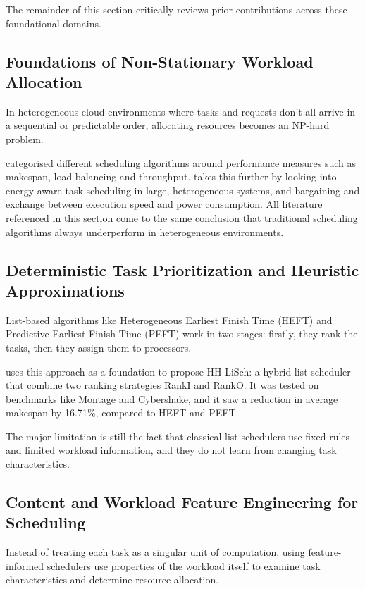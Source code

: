 The remainder of this section critically reviews prior contributions across these foundational domains.

\subsection{Foundations of Non-Stationary Workload Allocation}
In heterogeneous cloud environments where tasks and requests don't all arrive in a sequential or predictable order, allocating resources becomes an NP-hard problem.

\citet{Mathew2014Study} categorised different scheduling algorithms around performance measures such as makespan, load balancing and throughput. \citet{Saurav2021A} takes this further by looking into energy-aware task scheduling in large, heterogeneous systems, and bargaining and exchange between execution speed and power consumption. All literature referenced in this section come to the same conclusion that traditional scheduling algorithms always underperform in heterogeneous environments.

\subsection{Deterministic Task Prioritization and Heuristic Approximations}
List-based algorithms like Heterogeneous Earliest Finish Time (HEFT) and Predictive Earliest Finish Time (PEFT) work in two stages: firstly, they rank the tasks, then they assign them to processors.

\citet{HosseiniShirvani2021A} uses this approach as a foundation to propose HH-LiSch: a hybrid list scheduler that combine two ranking strategies RankI and RankO. It was tested on benchmarks like Montage and Cybershake, and it saw a reduction in average makespan by 16.71\%, compared to HEFT and PEFT.

The major limitation is still the fact that classical list schedulers use fixed rules and limited workload information, and they do not learn from changing task characteristics.

\subsection{Content and Workload Feature Engineering for Scheduling}
Instead of treating each task as a singular unit of computation, using feature-informed schedulers use properties of the workload itself to examine task characteristics and determine resource allocation.

